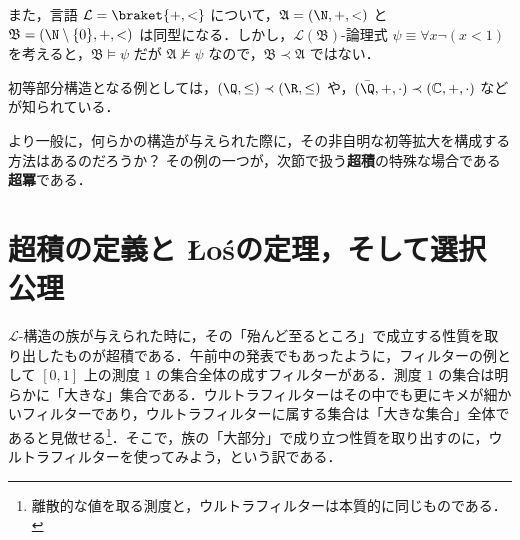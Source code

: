 \documentclass[a4j,xelatex,ja=standard]{ltjsarticle}
\newcommand{\Los}{{\L}o\'{s}}
\begin{document}
また，言語 $\mathcal{L} = \braket{ +, < }$ について，$\mathfrak{A} = (\N, +, <)$ と $\mathfrak{B} = (\N \setminus \{0\}, +, <)$ は同型になる．しかし，$\mathcal{L}(\mathfrak{B})$-論理式 $\psi \equiv \forall x \neg (x < 1)$ を考えると，$\mathfrak{B} \models \psi$ だが $\mathfrak{A} \not\models \psi$ なので，$\mathfrak{B} \prec \mathfrak{A}$ ではない．

初等部分構造となる例としては，$(\Q, \leq) \prec (\R, \leq)$ や，$(\bar{\Q}, +, \cdot) \prec (\mathbb{C}, +, \cdot)$ などが知られている．

より一般に，何らかの構造が与えられた際に，その非自明な初等拡大を構成する方法はあるのだろうか？
その例の一つが，次節で扱う{\bfseries 超積}の特殊な場合である{\bfseries 超冪}である．

\section{超積の定義と \Los の定理，そして選択公理}
$\mathcal{L}$-構造の族が与えられた時に，その「殆んど至るところ」で成立する性質を取り出したものが超積である．午前中の発表でもあったように，フィルターの例として $[0,1]$ 上の測度 $1$ の集合全体の成すフィルターがある．測度 $1$ の集合は明らかに「大きな」集合である．ウルトラフィルターはその中でも更にキメが細かいフィルターであり，ウルトラフィルターに属する集合は「大きな集合」全体であると見做せる\footnote{離散的な値を取る測度と，ウルトラフィルターは本質的に同じものである．}．そこで，族の「大部分」で成り立つ性質を取り出すのに，ウルトラフィルターを使ってみよう，という訳である．
\end{document}
